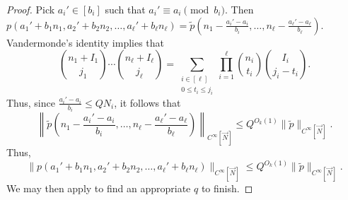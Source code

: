 \documentclass[11pt, a4paper]{amsart}
\theoremstyle{plain}
\theoremstyle{plain}
\theoremstyle{definition}
\theoremstyle{remark}
\numberwithin{equation}{section}
\numberwithin{lemma}{section}
\numberwithin{proposition}{section}
\numberwithin{corollary}{section}
\numberwithin{definition}{section}
\numberwithin{claim}{section}
\begin{document}
\begin{proof}
     Pick $a_i' \in [b_i]$ such that $a_i' \equiv a_i \pmod{b_i}$. Then $p(a_1' + b_1n_1, a_2' + b_2n_2, \dots, a_\ell' + b_\ell n_\ell) = \tilde{p}\left(n_1 - \frac{a_i' - a_i}{b_i}, \dots, n_\ell - \frac{a_\ell' - a_\ell}{b_\ell}\right)$. Vandermonde's identity implies that
    $$\binom{n_1 + I_1}{j_1} \cdots \binom{n_\ell + I_\ell}{j_\ell} = \sum_{\substack{i \in [\ell] \\ 0 \le t_i \le j_i}} \prod_{i = 1}^\ell \binom{n_i}{t_i}\binom{I_i}{j_i - t_i}.$$
    Thus, since $\frac{a_i' - a_i}{b_i} \le QN_i$, it follows that 
    $$\left\|\tilde{p}\left(n_1 - \frac{a_i' - a_i}{b_i}, \dots, n_\ell - \frac{a_\ell' - a_\ell}{b_\ell}\right)\right\|_{C^\infty[\vec{N}]} \le Q^{O_k(1)} \|\tilde{p}\|_{C^\infty[\vec{N}]}.$$
    Thus,
    $$\|p(a_1' + b_1n_1, a_2' + b_2n_2, \dots, a_\ell' + b_\ell n_\ell)\|_{C^\infty[\vec{N}]} \le Q^{O_k(1)}\|\tilde{p}\|_{C^\infty[\vec{N}]}.$$
    We may then apply \cite[Lemma 8.4]{GT12} to find an appropriate $q$ to finish.
\end{proof}
\end{document}
